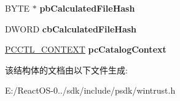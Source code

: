 \begin{DoxyCompactItemize}
\mbox{\label{struct_w_i_n_t_r_u_s_t___c_a_t_a_l_o_g___i_n_f_o___add7d1941de80e5eaa05fcf5dd5af14d7}} 
B\+Y\+TE $\ast$ {\bfseries pb\+Calculated\+File\+Hash}
\item 
\mbox{\label{struct_w_i_n_t_r_u_s_t___c_a_t_a_l_o_g___i_n_f_o___ab0ff5970601c6b1c2b910461df100c4a}} 
D\+W\+O\+RD {\bfseries cb\+Calculated\+File\+Hash}
\item 
\mbox{\label{struct_w_i_n_t_r_u_s_t___c_a_t_a_l_o_g___i_n_f_o___a9ee2f7553086c8836f84e26f82fe6e4d}} 
\hyperlink{struct___c_t_l___c_o_n_t_e_x_t}{P\+C\+C\+T\+L\+\_\+\+C\+O\+N\+T\+E\+XT} {\bfseries pc\+Catalog\+Context}
\end{DoxyCompactItemize}


该结构体的文档由以下文件生成\+:\begin{DoxyCompactItemize}
\item 
E\+:/\+React\+O\+S-\/0../sdk/include/psdk/wintrust.\+h\end{DoxyCompactItemize}
